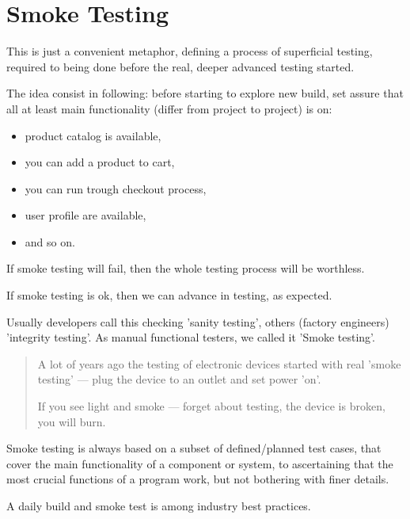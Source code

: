 \section{Smoke Testing}
\label{sec:Smoke Testing}

This is just a convenient metaphor, defining a process of superficial testing, required to being done before the real, deeper advanced testing started.

The idea consist in following: before starting to explore new build, set assure that all at least main functionality (differ from project to project) is on:

    \begin{itemize}
\item 
product catalog is available,
\item     you can add a product to cart,
\item     you can run trough checkout process,
\item     user profile are available,
\item     and so on.              \end{itemize}

If smoke testing will fail, then the whole testing process will be worthless.

If smoke testing is ok, then we can advance in testing, as expected.

Usually developers call this checking 'sanity testing', others (factory engineers) 'integrity testing'. As manual functional testers, we called it 'Smoke testing'.

\begin{quote}
A lot of years ago the testing of electronic devices started with real 'smoke testing' — plug the device to an outlet and set power 'on'.

If you see light and smoke — forget about testing, the device is broken, you will burn.                                                                        \end{quote} 

Smoke testing is always based on a subset of defined/planned test cases, that cover the main functionality of a component or system, to ascertaining that the most crucial functions of a program work, but not bothering with finer details.

A daily build and smoke test is among industry best practices.